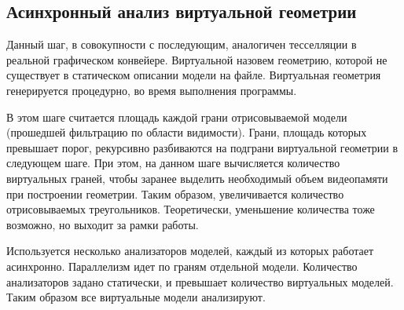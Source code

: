 \subsection{Асинхронный анализ виртуальной геометрии}

Данный шаг, в совокупности с последующим, аналогичен тесселляции в реальной графическом конвейере.
Виртуальной назовем геометрию, которой не существует в статическом описании модели на файле. Виртуальная геометрия генерируется процедурно, во время выполнения программы.

В этом шаге считается площадь каждой грани отрисовываемой модели (прошедшей фильтрацию по области видимости).
Грани, площадь которых превышает порог, рекурсивно разбиваются на подграни виртуальной геометрии в следующем шаге.
При этом, на данном шаге вычисляется количество виртуальных граней, чтобы заранее выделить необходимый объем видеопамяти при построении геометрии.
Таким образом, увеличивается количество отрисовываемых треугольников. Теоретически, уменьшение количества тоже возможно, но выходит за рамки работы.

Используется несколько анализаторов моделей, каждый из которых работает асинхронно. Параллелизм идет по граням отдельной модели.
Количество анализаторов задано статически, и превышает количество виртуальных моделей. Таким образом все виртуальные модели анализируют.

